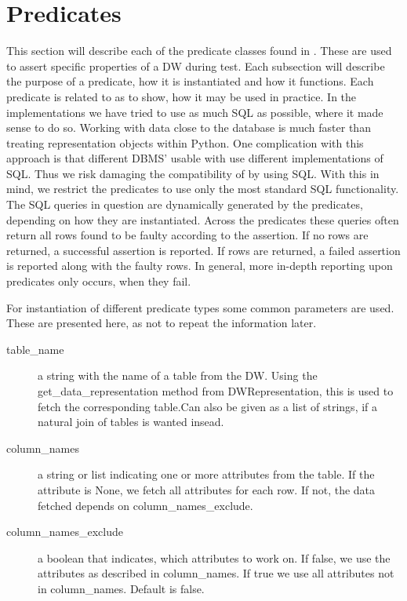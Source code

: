 \section{Predicates}\label{sect:pred}
This section will describe each of the predicate classes found in \FW. These are used to assert specific properties of a DW during test. Each subsection will describe the purpose of a predicate, how it is instantiated and how it functions. Each predicate is related to  as to show, how it may be used in practice. In the implementations we have tried to use as much SQL as possible, where it made sense to do so. Working with data close to the database is much faster than treating representation objects within Python. One complication with this approach is that different DBMS' usable
with \FW{} use different implementations of SQL. Thus we risk damaging the compatibility of \FW{} by using SQL. With this in mind, we restrict the predicates to use only the most standard SQL functionality. The SQL queries in question are dynamically generated by the predicates, depending on how they are instantiated. Across the predicates these queries often return all rows found to be faulty according to the assertion. If no rows are returned, a successful assertion is reported. If rows are returned, a failed assertion is reported along with the faulty rows. In general, more in-depth reporting upon predicates only occurs, when they fail.   

For instantiation of different predicate types some common parameters are used. These are presented here, as not to repeat the information later.
\begin{description}
\item [table\_name] a string with the name of a table from the DW. Using the get\_data\_representation method from DWRepresentation, this is used to fetch the corresponding table.Can also be given as a list of strings, if a natural join of tables is wanted insead.
\item [column\_names] a string or list indicating one or more attributes from the table. If the attribute is None, we fetch all attributes for each row. If not, the data fetched depends on column\_names\_exclude.
\item [column\_names\_exclude] a boolean that indicates, which attributes to work on. If false, we use the attributes as described in column\_names. If true we use all attributes not in column\_names. Default is false. 
\end{description}














